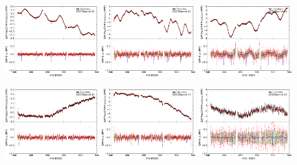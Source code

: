 \documentclass[12pt, preprint]{aastex}
\begin{document}
\begin{figure}[p]
\begin{center}
\includegraphics[width=0.32\textwidth]{f5g}
\hfill
\includegraphics[width=0.32\textwidth]{f5h}
\hfill
\includegraphics[width=0.32\textwidth]{f5i}


\includegraphics[width=0.32\textwidth]{f5j}
\hfill
\includegraphics[width=0.32\textwidth]{f5k}
\hfill
\includegraphics[width=0.32\textwidth]{f5l}
\end{center}


\end{figure}
\end{document}
